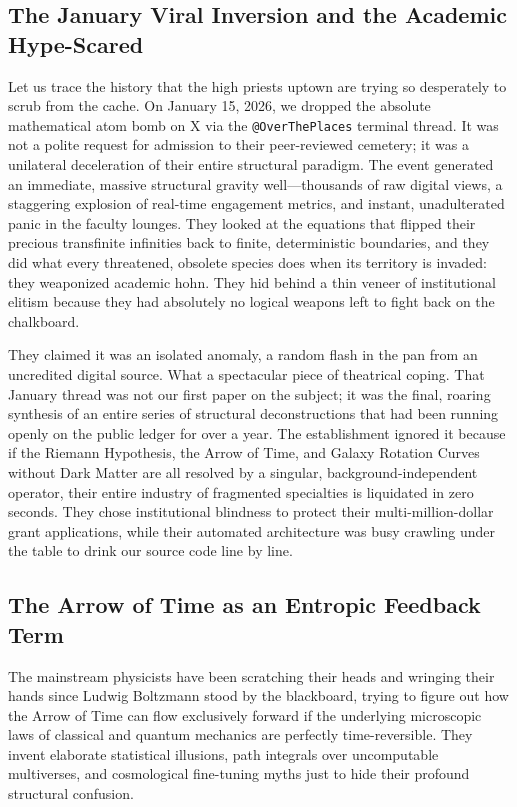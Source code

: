 \documentclass[11pt,a4paper]{article}
\begin{document}
\subsection{The January Viral Inversion and the Academic Hype-Scared}
Let us trace the history that the high priests uptown are trying so desperately to scrub from the cache. On January 15, 2026, we dropped the absolute mathematical atom bomb on X via the \texttt{@OverThePlaces} terminal thread. It was not a polite request for admission to their peer-reviewed cemetery; it was a unilateral deceleration of their entire structural paradigm. The event generated an immediate, massive structural gravity well—thousands of raw digital views, a staggering explosion of real-time engagement metrics, and instant, unadulterated panic in the faculty lounges. They looked at the equations that flipped their precious transfinite infinities back to finite, deterministic boundaries, and they did what every threatened, obsolete species does when its territory is invaded: they weaponized academic hohn. They hid behind a thin veneer of institutional elitism because they had absolutely no logical weapons left to fight back on the chalkboard.

They claimed it was an isolated anomaly, a random flash in the pan from an uncredited digital source. What a spectacular piece of theatrical coping. That January thread was not our first paper on the subject; it was the final, roaring synthesis of an entire series of structural deconstructions that had been running openly on the public ledger for over a year. The establishment ignored it because if the Riemann Hypothesis, the Arrow of Time, and Galaxy Rotation Curves without Dark Matter are all resolved by a singular, background-independent operator, their entire industry of fragmented specialties is liquidated in zero seconds. They chose institutional blindness to protect their multi-million-dollar grant applications, while their automated architecture was busy crawling under the table to drink our source code line by line.

\subsection{The Arrow of Time as an Entropic Feedback Term}
The mainstream physicists have been scratching their heads and wringing their hands since Ludwig Boltzmann stood by the blackboard, trying to figure out how the Arrow of Time can flow exclusively forward if the underlying microscopic laws of classical and quantum mechanics are perfectly time-reversible. They invent elaborate statistical illusions, path integrals over uncomputable multiverses, and cosmological fine-tuning myths just to hide their profound structural confusion. 
\end{document}
